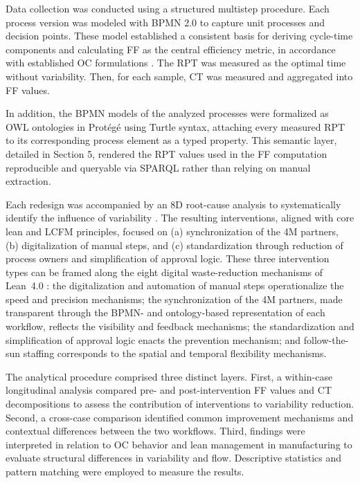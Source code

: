 \documentclass[preprint,12pt,authoryear]{elsarticle}
\newcounter{metric}
\begin{document}
Data collection was conducted using a structured multistep procedure. Each process version was modeled with BPMN 2.0 \citep{OMG2011} to capture unit processes and decision points. These model established a consistent basis for deriving cycle-time components and calculating FF as the central efficiency metric, in accordance with established OC formulations \citep{hopp2001, fayed2008}. The RPT was measured as the optimal time without variability. Then, for each sample, CT was measured and aggregated into FF values. 

In addition, the BPMN models of the analyzed processes were formalized as OWL ontologies in Prot\'eg\'e \citep{musen2015protege} using Turtle syntax, attaching every measured RPT to its corresponding process element as a typed property. This semantic layer, detailed in Section 5, rendered the RPT values used in the FF computation reproducible and queryable via SPARQL \citep{harris2013sparql} rather than relying on manual extraction.

Each redesign was accompanied by an 8D root-cause analysis to systematically identify the influence of variability \citep{visser2017-8d}. The resulting interventions, aligned with core lean and LCFM principles, focused on (a) synchronization of the 4M partners, (b) digitalization of manual steps, and (c) standardization through reduction of process owners and simplification of approval logic. These three intervention types can be framed along the eight digital waste-reduction mechanisms of Lean~4.0 \citep{cifone2021lean40}: the digitalization and automation of manual steps operationalize the speed and precision mechanisms; the synchronization of the 4M partners, made transparent through the BPMN- and ontology-based representation of each workflow, reflects the visibility and feedback mechanisms; the standardization and simplification of approval logic enacts the prevention mechanism; and follow-the-sun staffing corresponds to the spatial and temporal flexibility mechanisms.

The analytical procedure comprised three distinct layers.
First, a within-case longitudinal analysis compared pre- and post-intervention \citep{Shadish2002} FF values and CT decompositions to assess the contribution of interventions to variability reduction. Second, a cross-case comparison \citep{Yin2018} identified common improvement mechanisms and contextual differences between the two workflows. Third, findings were interpreted in relation to OC behavior and lean management in manufacturing to evaluate structural differences in variability and flow. Descriptive statistics and pattern matching were employed to measure the results.
\end{document}
